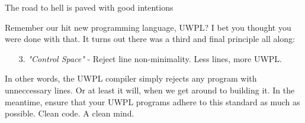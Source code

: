 \toggletrue{IsScore}
{The road to hell is paved with good intentions}

Remember our hit new programming language, UWPL? I bet you thought you were done with that.
It turns out there was a third and final principle all along:
\begin{enumerate}
    \item[3.] \textit{"Control Space"} - 
    Reject line non-minimality. Less lines, more UWPL.
\end{enumerate}

In other words, the UWPL compiler simply rejects any program with unneccessary lines.
Or at least it will, when we get around to building it.
In the meantime, ensure that your UWPL programs adhere to this standard as much as possible.
Clean code. A clean mind.

\begin{figure}[h]
    \centering
\end{figure}

